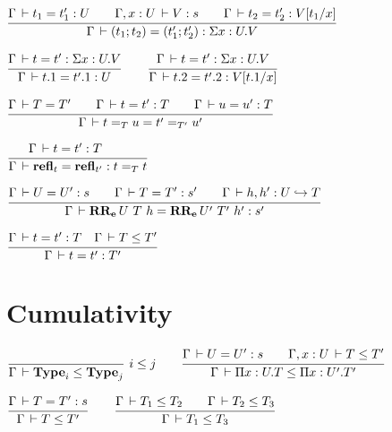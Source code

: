 \documentclass[a4paper,english]{lipics-utf8x}
\begin{document}
  \begin{center}
  \(
    \ru{\Gamma \der t_1 = t'_1 : U \qquad
        \Gamma, x:U \der V : s \qquad
        \Gamma \der t_2 = t'_2 : V[t_1/x]
      }{\Gamma \der (t_1;t_2) = (t'_1;t'_2) : \Sigma x:U.V}
  \)
  \end{center}

  \begin{center}
  \(
    \ru{\Gamma \der t = t' : \Sigma x:U.V
      }{\Gamma \der t.1 = t'.1 : U}
    \qquad
    \ru{\Gamma \der t = t' : \Sigma x:U.V
      }{\Gamma \der t.2 = t'.2 : V[t.1/x]}
  \)
  \end{center}

  \begin{center}
  \(
    \ru{\Gamma \der T = T' \qquad
        \Gamma \der t = t' : T \qquad
        \Gamma \der u = u' : T
      }{\Gamma \der t =_T u = t' =_{T'} u'}
  \)
  \end{center}

  \begin{center}
  \(
    \ru{\Gamma \der t = t' : T \qquad
      }{\Gamma \der \refl_t = \refl_{t'} : t =_T t}
  \)
  \end{center}

  \begin{center}
  \(
    \ru{\Gamma \der U = U' : s \qquad
        \Gamma \der T = T' : s' \qquad
        \Gamma \der h, h' : \emb{U}{T}
      }{\Gamma \der \RRe{U}{T}{h} = \RRe{U'}{T'}{h'} : s'}
  \)
  \end{center}


  \begin{center}
  \(
    \ru{\Gamma \der t = t' : T \quad
        \Gamma \der T \le T'
      }{\Gamma \der t = t' : T'}
  \)
  \end{center}


  \section{Cumulativity}

  \begin{center}
  \(
    \rux{}{\Gamma \der \Type_i \le \Type_j}{i \le j}
    \qquad
    \ru{\Gamma \der U = U' : s \qquad
        \Gamma, x:U \der T \le T'
      }{\Gamma \der \Pi x:U.T \le \Pi x:U'.T'}
  \)
  \end{center}

  \begin{center}
  \(
    \ru{\Gamma \der T = T' : s
      }{\Gamma \der T \le T'}
    \qquad
    \ru{\Gamma \der T_1 \le T_2 \qquad
        \Gamma \der T_2 \le T_3
      }{\Gamma \der T_1 \le T_3}
  \)
  \end{center}
\end{document}
